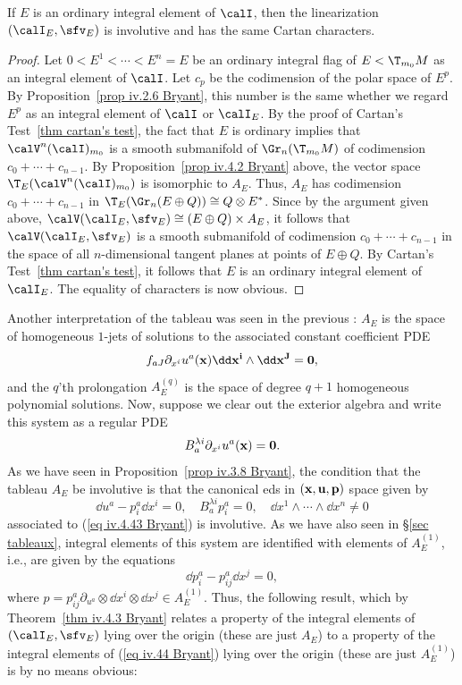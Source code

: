 \begin{thm}\label{thm iv.4.3 Bryant}
    If $E$ is an ordinary integral element of $\calI$, then the linearization $(\calI_E,\sfv_E)$ is involutive and has the same Cartan characters.
\end{thm}
\begin{proof}
    Let $0<E^1<\cdots<E^n=E$ be an ordinary integral flag of $E<\T_{m_0}M$ as an integral element of $\calI$. Let $c_p$ be the codimension of the polar space of $E^p$. By Proposition~\ref{prop iv.2.6 Bryant}, this number is the same whether we regard $E^p$ as an integral element of $\calI$ or $\calI_E$. By the proof of Cartan's Test~\ref{thm cartan's test}, the fact that $E$ is ordinary implies that $\calV^n(\calI)_{m_0}$ is a smooth submanifold of $\Gr_n(\T_{m_0}M)$ of codimension $c_0+\cdots+c_{n-1}$. By Proposition~\ref{prop iv.4.2 Bryant} above, the vector space $\T_E(\calV^n(\calI)_{m_0})$ is isomorphic to $A_E$. Thus, $A_E$ has codimension $c_0+\cdots+c_{n-1}$ in $\T_E(\Gr_n(E\oplus Q))\cong Q\otimes E^\ast$. Since by the argument given above, $\calV(\calI_E,\sfv_E)\cong (E\oplus Q)\times A_E$, it follows that $\calV(\calI_E,\sfv_E)$ is a smooth submanifold of codimension $c_0+\cdots+c_{n-1}$ in the space of all $n$-dimensional tangent planes at points of $E\oplus Q$. By Cartan's Test~\ref{thm cartan's test}, it follows that $E$ is an ordinary integral element of $\calI_E$. The equality of characters is now obvious.
\end{proof}

Another interpretation of the tableau was seen in the previous \sect: $A_E$ is the space of homogeneous $1$-jets of solutions to the associated constant coefficient PDE
\[f_{aJ}\partial_{x^i}u^a(\bf{x})\dd x^i\wedge\dd x^J=0,\]
and the $q$'th prolongation $A_E^{(q)}$ is the space of degree $q+1$ homogeneous polynomial solutions. Now, suppose we clear out the exterior algebra and write this system as a regular PDE
\[B^{\lambda i}_a \partial_{x^i}u^a(\bf{x})=0.\label{eq iv.4.43 Bryant}\]
As we have seen in Proposition~\ref{prop iv.3.8 Bryant}, the condition that the tableau $A_E$ be involutive is that the canonical \gls{eds} in $(\bf{x},\bf{u},\bf{p})$ space given by 
\[\dd u^a-p^a_i\dd x^i=0,\quad B^{\lambda i}_a p^a_i=0,\quad \dd x^1\wedge\cdots\wedge\dd x^n\neq 0\label{eq iv.44 Bryant}\]
associated to (\ref{eq iv.4.43 Bryant}) is involutive. As we have also seen in \S\ref{sec tableaux}, integral elements of this system are identified with elements of $A_E^{(1)}$, i.e., are given by the equations 
\[\dd p^a_i-p^a_{ij}\dd x^j=0,\]
where $p=p^a_{ij}\partial_{u^a}\otimes \dd x^i\otimes \dd x^j\in A^{(1)}_E$. Thus, the following result, which by Theorem~\ref{thm iv.4.3 Bryant} relates a property of the integral elements of $(\calI_E,\sfv_E)$ lying over the origin (these are just $A_E$) to a property of the integral elements of (\ref{eq iv.44 Bryant}) lying over the origin (these are just $A_E^{(1)}$) is by no means obvious:

